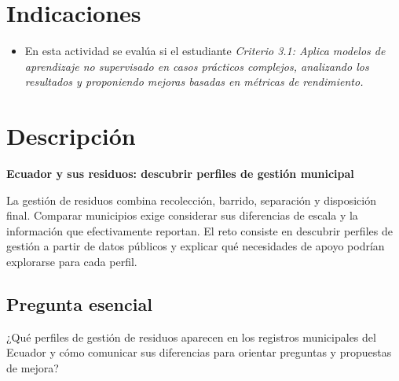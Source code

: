 \documentclass[a4,11pt]{aleph-notas}
\begin{document}
\encabezado

\section{Indicaciones}
\begin{itemize}[leftmargin=*]
\item
    En esta actividad se evalúa si el estudiante \textit{Criterio 3.1: Aplica modelos de aprendizaje no supervisado en casos prácticos complejos, analizando los resultados y proponiendo mejoras basadas en métricas de rendimiento.}
\end{itemize}


\section{Descripción}

\begin{center}
    \large\bf Ecuador y sus residuos: descubrir perfiles de gestión municipal
\end{center}

La gestión de residuos combina recolección, barrido, separación y disposición final. Comparar municipios exige considerar sus diferencias de escala y la información que efectivamente reportan. El reto consiste en descubrir perfiles de gestión a partir de datos públicos y explicar qué necesidades de apoyo podrían explorarse para cada perfil.

\subsection*{Pregunta esencial}
¿Qué perfiles de gestión de residuos aparecen en los registros municipales del Ecuador y cómo comunicar sus diferencias para orientar preguntas y propuestas de mejora?
\end{document}

